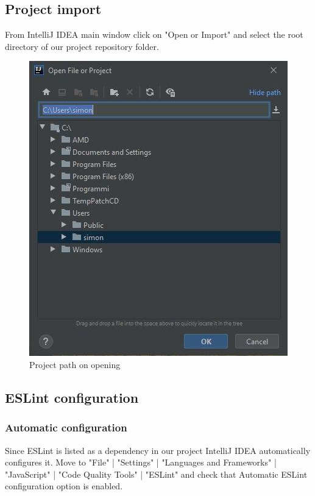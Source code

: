 	\subsection{Project import}
From IntelliJ IDEA main window click on "Open or Import" and select the root directory of our project repository folder.

\begin{figure}[H]
		\centering
		\includegraphics[scale=0.80]{../Developer_manual/img/open_project.jpg}
		\caption{Project path on opening}
	\end{figure}	


	\subsection{ESLint configuration}
		\subsubsection{Automatic configuration}
Since ESLint is listed as a dependency in our project IntelliJ IDEA automatically configures it. Move to "File" | "Settings" | "Languages and Frameworks" | "JavaScript" | "Code Quality Tools" | "ESLint" and check that Automatic ESLint configuration option is enabled. 


